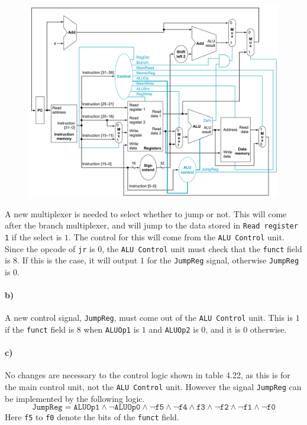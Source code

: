 \documentclass[12pt]{article}
\begin{document}
\begin{figure}[!ht]
    \begin{center}
        \includegraphics[width=4.4in]{problem8a.png}
    \end{center}
\end{figure}
A new multiplexer is needed to select whether to jump or not. This will come after the branch multiplexer, and will
jump to the data stored in \texttt{Read register 1} if the select is \(1\). The control for this will come
from the \texttt{ALU Control} unit. Since the opcode of \texttt{jr} is \(0\), the \texttt{ALU Control} unit
must check that the \texttt{funct} field is \(8\). If this is the case, it will output \(1\) for the \texttt{JumpReg}
signal, otherwise \texttt{JumpReg} is \(0\).

\paragraph{b)}

A new control signal, \texttt{JumpReg}, must come out of the \texttt{ALU Control} unit. This is \(1\) if the \texttt{funct} field is \(8\)
when \texttt{ALUOp1} is \(1\) and \texttt{ALUOp2} is \(0\), and it is \(0\) otherwise.

\paragraph{c)}

No changes are necessary to the control logic shown in table 4.22, as this is for the main control unit, not the \texttt{ALU Control}
unit. However the signal \texttt{JumpReg} can be implemented by the following logic.
\[\texttt{JumpReg}=\texttt{ALUOp1}\wedge\neg\texttt{ALUOp0}\wedge\neg\texttt{f5}\wedge\neg\texttt{f4}\wedge\texttt{f3}\wedge
\neg\texttt{f2}\wedge\neg\texttt{f1}\wedge\neg\texttt{f0}\]
Here \texttt{f5} to \texttt{f0} denote the bits of the \texttt{funct} field.
\end{document}
